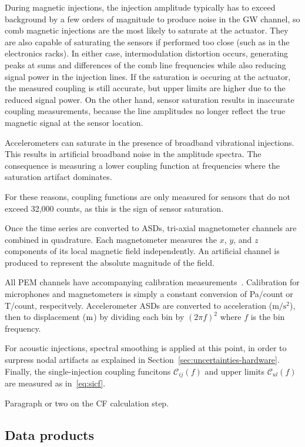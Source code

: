 During magnetic injections, the injection amplitude typically has to exceed background by a few orders of magnitude to produce noise in the \ac{GW} channel, so comb magnetic injections are the most likely to saturate at the actuator.
They are also capable of saturating the sensors if performed too close (such as in the electronics racks).
In either case, intermodulation distortion occurs, generating peaks at sums and differences of the comb line frequencies while also reducing signal power in the injection lines.
If the saturation is occuring at the actuator, the measured coupling is still accurate, but upper limits are higher due to the reduced signal power.
On the other hand, sensor saturation results in inaccurate coupling measurements, because the line amplitudes no longer reflect the true magnetic signal at the sensor location.

Accelerometers can saturate in the presence of broadband vibrational injections.
This results in artificial broadband noise in the amplitude spectra.
The consequence is measuring a lower coupling function at frequencies where the saturation artifact dominates.

For these reasons, coupling functions are only measured for sensors that do not exceed 32,000 counts, as this is the sign of sensor saturation.

Once the time series are converted to \acp{ASD}, tri-axial magnetometer channels are combined in quadrature.
Each magnetometer measures the $x$, $y$, and $z$ components of its local magnetic field independently.
An artificial channel is produced to represent the absolute magnitude of the field.

All \ac{PEM} channels have accompanying calibration measurements~\citep{PEM_website}. Calibration for microphones and magnetometers is simply a constant conversion of Pa/count or T/count, respecitvely.
Accelerometer \acp{ASD} are converted to acceleration ($\mathrm{m/s^2}$), then to displacement ($\meter$) by dividing each bin by $(2\pi f)^2$ where $f$ is the bin frequency.

For acoustic injections, spectral smoothing is applied at this point, in order to surpress nodal artifacts as explained in Section~\ref{sec:uncertainties-hardware}.
Finally, the single-injection coupling funcitons $\mathcal{C}_{ij}(f)$ and upper limits $\mathcal{C}_{ul}(f)$ are measured as in~\cref{eq:sicf}.

{\color{red}
Paragraph or two on the CF calculation step.}

\subsection{Data products}

